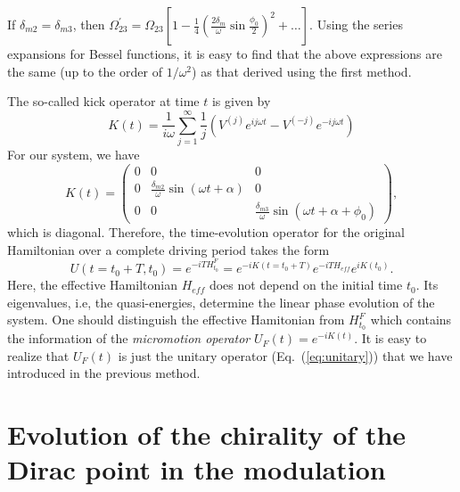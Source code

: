 \documentclass[aps,prl,twocolumn,floatfix,reprint]{revtex4}
\begin{document}
\begin{widetext}
If $\delta_{m2}=\delta_{m3}$, then $\Omega_{23}^\prime=\Omega_{23}\left[ 1-%
\frac{1}{4}\left(\frac{2\delta_m}{\omega}\sin\frac{\phi_0}{2}
\right)^2+\ldots \right]$. Using the series expansions for Bessel functions,
it is easy to find that the above expressions are the same (up to the order
of $1/\omega^2$) as that derived using the first method.

The so-called kick operator at time $t$ is given by
\begin{equation}
K(t)=\frac{1}{i\omega }\sum_{j=1}^{\infty }\frac{1}{j}\left(
V^{(j)}e^{ij\omega t}-V^{(-j)}e^{-ij\omega t}\right)
\end{equation}%
For our system, we have
\begin{equation}
K(t)=\left(
\begin{array}{ccc}
0 & 0 & 0 \\
0 & \frac{\delta _{m2}}{\omega }\sin (\omega t+\alpha ) & 0 \\
0 & 0 & \frac{\delta _{m3}}{\omega }\sin (\omega t+\alpha +\phi _{0})%
\end{array}%
\right),
\end{equation}%
which is diagonal. Therefore, the time-evolution operator for the original
Hamiltonian over a complete driving period takes the form
\begin{equation}
U(t=t_0+T, t_0)=e^{-iTH_{t_0}^{F}}=e^{-iK(t=t_0+T)}e^{-iTH_{eff}}e^{iK(t_0)}.
\end{equation}%
Here, the effective Hamiltonian $H_{eff}$ does not depend on the initial
time $t_0$. Its eigenvalues, i.e, the quasi-energies, determine the linear
phase evolution of the system. One should distinguish the effective
Hamitonian from $H_{t_0}^F$ which contains the information of the \textit{%
micromotion operator} $U_F(t)=e^{-iK(t)}$. It is easy to realize that $U_F(t)
$ is just the unitary operator (Eq.~(\ref{eq:unitary})) that we have
introduced in the previous method.

\section{Evolution of the chirality of the Dirac point in the modulation}


\end{widetext}
\end{document}
